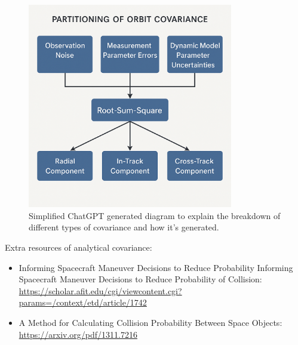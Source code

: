 \documentclass[12pt]{report}
\begin{document}
\begin{enumerate}
  \begin{figure}[H]
      \centering
      \includegraphics[width=0.8\textwidth]{figure_week_10_covariance.png}
      \caption{Simplified ChatGPT generated diagram to explain the breakdown of different types of covariance and how it's generated.}
      \label{fig:Covariance_Diagaram}
  \end{figure}

  Extra resources of analytical covariance:
  \begin{itemize}
    \item Informing Spacecraft Maneuver Decisions to Reduce Probability Informing Spacecraft Maneuver Decisions to Reduce Probability of Collision: \url{https://scholar.afit.edu/cgi/viewcontent.cgi?params=/context/etd/article/1742}
    \item A Method for Calculating Collision Probability Between Space Objects: \url{https://arxiv.org/pdf/1311.7216}
  \end{itemize}

\end{enumerate}
\end{document}
